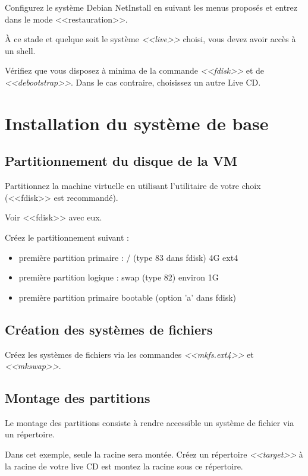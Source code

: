\documentclass[11pt]{article}
\begin{document}
Configurez le système Debian NetInstall en suivant les menus proposés et entrez
dans le mode <<restauration>>.

À ce stade et quelque soit le système \emph{<<live>>} choisi, vous devez avoir
accès à un shell.

Vérifiez que vous disposez à minima de la commande \emph{<<fdisk>>} et de
\emph{<<debootstrap>>}. Dans le cas contraire, choisissez un autre Live CD.

\section{Installation du système de base}

\subsection{Partitionnement du disque de la VM}

Partitionnez la machine virtuelle en utilisant l'utilitaire de votre choix
(<<fdisk>> est recommandé).

\begin{solution}
Voir <<fdisk>> avec eux.
\end{solution}

Créez le partitionnement suivant :

\begin{itemize}
 \item première partition primaire : / (type 83 dans fdisk) 4G ext4
 \item première partition logique : swap (type 82) environ 1G
 \item première partition primaire bootable (option 'a' dans fdisk)
\end{itemize}

\subsection{Création des systèmes de fichiers}

Créez les systèmes de fichiers via les commandes \emph{<<mkfs.ext4>>} et
\emph{<<mkswap>>}.

\subsection{Montage des partitions}

Le montage des partitions consiste à rendre accessible un système de fichier
via un répertoire.

Dans cet exemple, seule la racine sera montée. Créez un répertoire
\emph{<<target>>} à la racine de votre live CD est montez la racine sous ce
répertoire.
\end{document}
